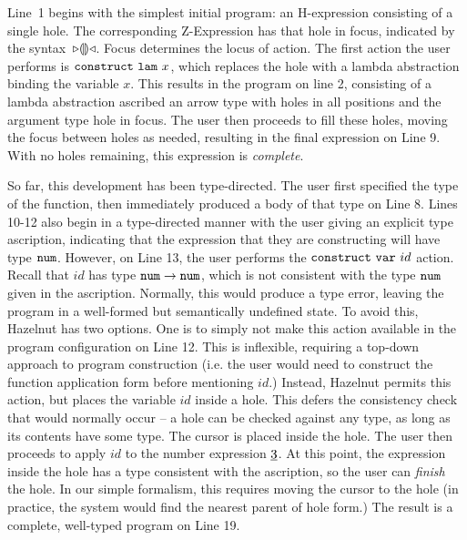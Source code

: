 \documentclass{llncs}
\begin{document}
Line~1 begins with the simplest initial program: an H-expression 
consisting of a single hole. The corresponding Z-Expression has that hole in focus,
indicated by the syntax~${\triangleright}{\llparenthesis\rrparenthesis}{\triangleleft}$. Focus determines the locus of action. The first action the user performs is $\mathtt{construct}~\mathtt{lam}~x$, which replaces the hole with a lambda abstraction binding the variable $x$. This results in the program on line
2, consisting of a lambda abstraction ascribed an arrow type with holes in all positions and the argument type hole in focus. The
user then proceeds to fill these holes, moving the focus between holes as needed, resulting in the final expression on Line 9. With no holes remaining, this expression is \emph{complete}.%

So far, this development has been type-directed. The user first specified the type of the function, then immediately produced a body of that type on Line 8. Lines 10-12 also begin in a type-directed manner with the user giving an explicit type ascription, indicating that the expression that they are constructing will have type $\texttt{num}$. However, on Line 13, the user performs the $\mathtt{construct}~\mathtt{var}~id$ action. Recall that $id$ has type $\texttt{num} \rightarrow \texttt{num}$, which is not consistent with the type $\texttt{num}$ given in the ascription. Normally, this would produce a type error, leaving the program in a well-formed but semantically undefined state. To avoid this, Hazelnut has two options. One is to simply not make this action available in the program configuration on Line 12. This is inflexible, requiring a top-down approach to program construction (i.e. the user would need to construct the function application form before mentioning $id$.) Instead, Hazelnut permits this action, but places the variable $id$ inside a hole. This defers the consistency check that would normally occur -- a hole can be checked against any type, as long as its contents have some type. The cursor is placed inside the hole. The user then proceeds to apply $id$ to the number expression $\underline{3}$. At this point, the expression inside the hole has a type consistent with the ascription, so the user can \emph{finish} the hole. In our simple formalism, this requires moving the cursor to the hole (in practice, the system would find the nearest parent of hole form.) The result is a complete, well-typed program on Line 19.

\end{document}
